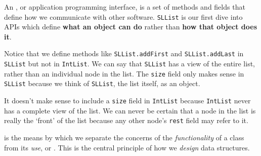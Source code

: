 An , or application programming interface, is a set of methods and fields that define how we communicate with other software. \texttt{SLList} is our first dive into APIs which define \textbf{what an object can do} rather than \textbf{how that object does it}.

Notice that we define methods like \texttt{SLList.addFirst} and \texttt{SLList.addLast} in \texttt{SLList} but not in \texttt{IntList}. We can say that \texttt{SLList} has a view of the entire list, rather than an individual node in the list. The \texttt{size} field only makes sense in \texttt{SLList} because we think of \texttt{SLList}, the list itself, as an object.

It doesn't make sense to include a \texttt{size} field in \texttt{IntList} because \texttt{IntList} never has a complete view of the list. We can never be certain that a node in the list is really the `front' of the list because any other node's \texttt{rest} field may refer to it.

 is the means by which we separate the concerns of the \textit{functionality} of a class from its \textit{use}, or . This is the central principle of how we \textit{design} data structures.